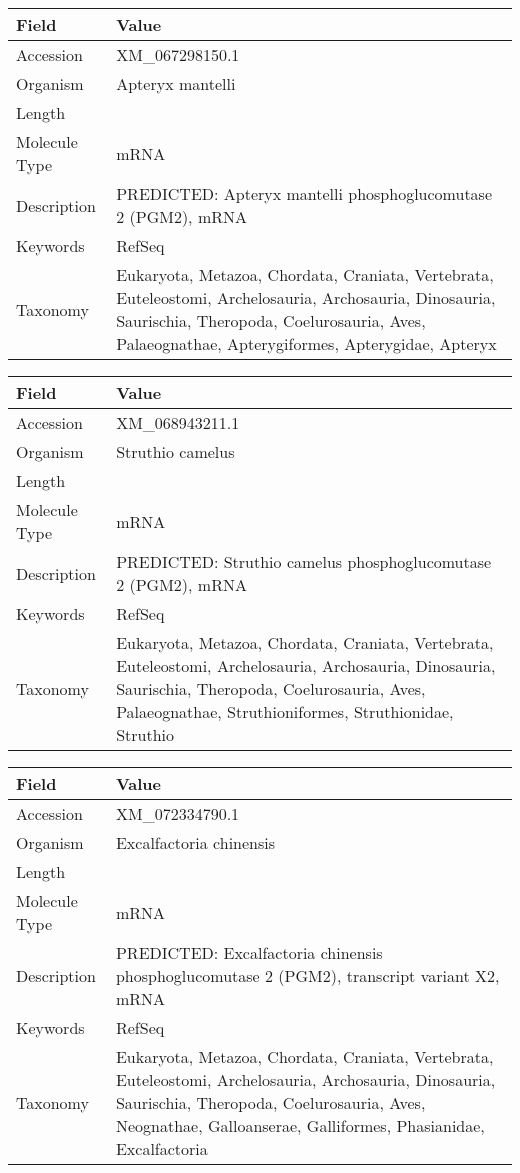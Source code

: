 \documentclass[10pt]{article}
\begin{document}
{\footnotesize
\begin{longtable}{>{\raggedright\arraybackslash}p{4.5cm} >{\raggedright\arraybackslash}p{11.5cm}}
\textbf{Field} & \textbf{Value} \\
\hline
Accession & XM\_067298150.1 \\
Organism & Apteryx mantelli \\
Length & 2003 \\
Molecule Type & mRNA \\
Description & PREDICTED: Apteryx mantelli phosphoglucomutase 2 (PGM2), mRNA \\
Keywords & RefSeq \\
Taxonomy & Eukaryota, Metazoa, Chordata, Craniata, Vertebrata, Euteleostomi, Archelosauria, Archosauria, Dinosauria, Saurischia, Theropoda, Coelurosauria, Aves, Palaeognathae, Apterygiformes, Apterygidae, Apteryx \\
\end{longtable}
}

{\footnotesize
\begin{longtable}{>{\raggedright\arraybackslash}p{4.5cm} >{\raggedright\arraybackslash}p{11.5cm}}
\textbf{Field} & \textbf{Value} \\
\hline
Accession & XM\_068943211.1 \\
Organism & Struthio camelus \\
Length & 2179 \\
Molecule Type & mRNA \\
Description & PREDICTED: Struthio camelus phosphoglucomutase 2 (PGM2), mRNA \\
Keywords & RefSeq \\
Taxonomy & Eukaryota, Metazoa, Chordata, Craniata, Vertebrata, Euteleostomi, Archelosauria, Archosauria, Dinosauria, Saurischia, Theropoda, Coelurosauria, Aves, Palaeognathae, Struthioniformes, Struthionidae, Struthio \\
\end{longtable}
}

{\footnotesize
\begin{longtable}{>{\raggedright\arraybackslash}p{4.5cm} >{\raggedright\arraybackslash}p{11.5cm}}
\textbf{Field} & \textbf{Value} \\
\hline
Accession & XM\_072334790.1 \\
Organism & Excalfactoria chinensis \\
Length & 2015 \\
Molecule Type & mRNA \\
Description & PREDICTED: Excalfactoria chinensis phosphoglucomutase 2 (PGM2), transcript variant X2, mRNA \\
Keywords & RefSeq \\
Taxonomy & Eukaryota, Metazoa, Chordata, Craniata, Vertebrata, Euteleostomi, Archelosauria, Archosauria, Dinosauria, Saurischia, Theropoda, Coelurosauria, Aves, Neognathae, Galloanserae, Galliformes, Phasianidae, Excalfactoria \\
\end{longtable}
}
\end{document}
